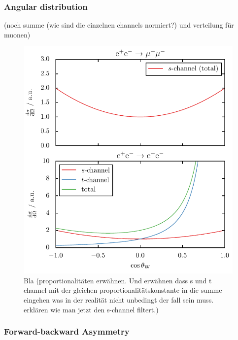 \documentclass[11pt, a4paper]{article}
\numberwithin{equation}{section}
\newcommand{\korr}[1]{{\color{red}(#1)}}
\begin{document}
\subsubsection{Angular distribution}
\korr{noch summe (wie sind die einzelnen channels normiert?) und verteilung für muonen}
\begin{figure}
	\centering
	\includegraphics{./figures/s_t_channel.pdf}
	\caption{Bla \korr{proportionalitäten erwähnen. Und erwähnen dass s und t channel mit der gleichen proportionalitätskonstante in die summe eingehen was in der realität nicht unbedingt der fall sein muss. erklären wie man jetzt den s-channel filtert.}}
\end{figure}

\subsubsection{Forward-backward Asymmetry}
\end{document}
